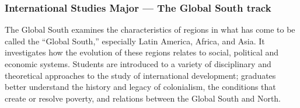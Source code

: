 \documentclass[
  letterpaper,
]{scrbook}
\begin{document}
\subsubsection{International Studies Major --- The Global South
track}\label{international-studies-major-the-global-south-track}

The Global South examines the characteristics of regions in what has
come to be called the ``Global South,'' especially Latin America,
Africa, and Asia. It investigates how the evolution of these regions
relates to social, political and economic systems. Students are
introduced to a variety of disciplinary and theoretical approaches to
the study of international development; graduates better understand the
history and legacy of colonialism, the conditions that create or resolve
poverty, and relations between the Global South and North.
\end{document}
